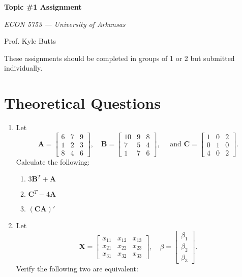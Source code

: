 \documentclass[12pt]{article}
\begin{document}
\begin{center}
  {\Huge\bf Topic \#1 Assignment}

  \smallskip
  {\large\it  ECON 5753 — University of Arkansas}

  \medskip
  {\large Prof. Kyle Butts}
\end{center}

These assignments should be completed in groups of 1 or 2 but submitted individually.

\section*{Theoretical Questions}

\begin{enumerate}
  \item Let
  $$
    \bm{A} = \begin{bmatrix} 6 & 7 & 9 \\ 1 & 2 & 3 \\ 8 & 4 & 6 \end{bmatrix},
    \quad
    \bm{B} = \begin{bmatrix} 10 & 9 & 8 \\ 7 & 5 & 4 \\ 1 & 7 & 6 \end{bmatrix},
    \quad \text{ and }
    \bm{C} = \begin{bmatrix} 1 & 0 & 2 \\ 0 & 1 & 0 \\ 4 & 0 & 2 \end{bmatrix}.
  $$
  Calculate the following:

  \begin{enumerate}
    \item $3\bm{B}^T + \bm{A}$
    \item $\bm{C}^T - 4\bm{A}$
    \item $(\bm{C}\bm{A})'$
  \end{enumerate}

  \bigskip\bigskip
  \item Let
  $$
    \bm{X} = \begin{bmatrix} x_{11} & x_{12} & x_{13} \\ x_{21} & x_{22} & x_{23} \\ x_{31} & x_{32} & x_{33} \end{bmatrix},
    \quad
    \beta = \begin{bmatrix} \beta_1 \\ \beta_2 \\ \beta_3 \end{bmatrix}.
  $$
  Verify the following two are equivalent:


\end{enumerate}
\end{document}
